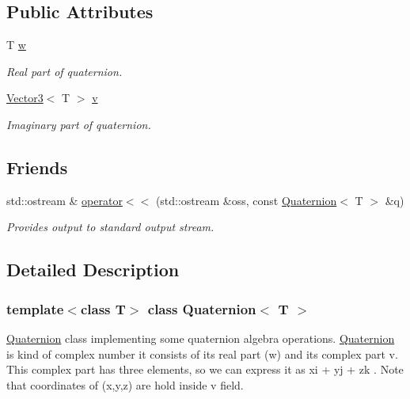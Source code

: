 \subsection*{Public Attributes}
\begin{DoxyCompactItemize}
\item 
T \hyperlink{class_quaternion_ab3d38cb2d28ba85f00f48768f8fa2815}{w}
\begin{DoxyCompactList}\small\item\em Real part of quaternion. \item\end{DoxyCompactList}\item 
\hyperlink{class_vector3}{Vector3}$<$ T $>$ \hyperlink{class_quaternion_a14b395e80f7c6a1687a824f2adb1eb9b}{v}
\begin{DoxyCompactList}\small\item\em Imaginary part of quaternion. \item\end{DoxyCompactList}\end{DoxyCompactItemize}
\subsection*{Friends}
\begin{DoxyCompactItemize}
\item 
std::ostream \& \hyperlink{class_quaternion_a871c9e237d4b87d722a3e6495f377c23}{operator$<$$<$} (std::ostream \&oss, const \hyperlink{class_quaternion}{Quaternion}$<$ T $>$ \&q)
\begin{DoxyCompactList}\small\item\em Provides output to standard output stream. \item\end{DoxyCompactList}\end{DoxyCompactItemize}


\subsection{Detailed Description}
\subsubsection*{template$<$class T$>$ class Quaternion$<$ T $>$}

\hyperlink{class_quaternion}{Quaternion} class implementing some quaternion algebra operations. \hyperlink{class_quaternion}{Quaternion} is kind of complex number it consists of its real part (w) and its complex part v. This complex part has three elements, so we can express it as xi + yj + zk . Note that coordinates of (x,y,z) are hold inside v field. 

